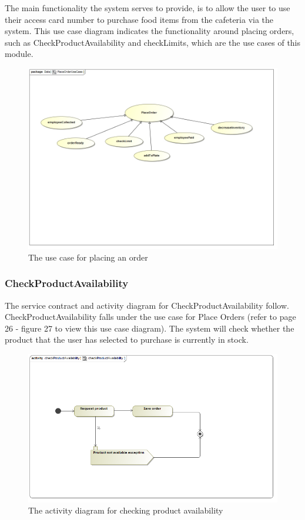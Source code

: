 \documentclass[a4paper,12pt]{report}
\begin{document}
The main functionality the system serves to provide, is  to allow the user to use their access card number to purchase food items from the cafeteria via the system. This use case diagram indicates the functionality around placing orders, such as CheckProductAvailability and checkLimits, which are the use cases of this module.

\begin{figure}[H]
  \centering
    \includegraphics[width=1.0\textwidth]{../images/PlaceOrderUseCase.jpg}
    \caption{The use case for placing an order} 
\end{figure}
 
\subsubsection{CheckProductAvailability}
The service contract and activity diagram for CheckProductAvailability follow. CheckProductAvailability falls under the use case for Place Orders (refer to page 26 - figure 27 to view this use case diagram). The system will check whether the product that the user has selected to purchase is currently in stock.
\begin{figure}[H]
  \centering
    \includegraphics[width=1.0\textwidth]{../images/checkProductAvailability.png}
    \caption{The activity diagram for checking product availability } 
\end{figure}
 
\end{document}
